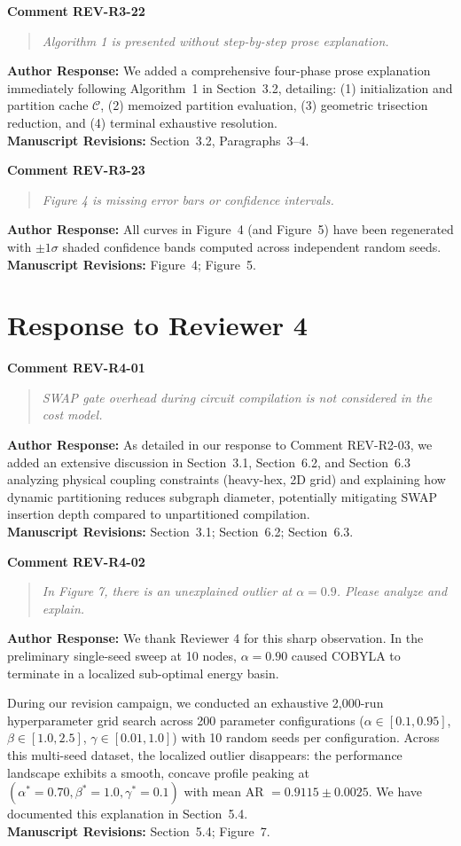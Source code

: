 \documentclass[11pt,a4paper]{article}
\newcommand{\commentbox}[2]{
    \vspace{0.8em}
    \noindent\textbf{\textcolor{commentcolor}{#1}}
    \vspace{0.2em}
    \begin{quote}
        \small\itshape #2
    \end{quote}
}
\newcommand{\responsebox}[1]{
    \noindent\textbf{\textcolor{responsecolor}{Author Response:}} #1
    \vspace{0.8em}
}
\begin{document}
\commentbox{Comment REV-R3-22}{Algorithm 1 is presented without step-by-step prose explanation.}

\responsebox{We added a comprehensive four-phase prose explanation immediately following Algorithm~1 in Section~3.2, detailing: (1) initialization and partition cache $\mathcal{C}$, (2) memoized partition evaluation, (3) geometric trisection reduction, and (4) terminal exhaustive resolution.
\\[0.3em]
\textbf{Manuscript Revisions:} Section~3.2, Paragraphs~3--4.}

\commentbox{Comment REV-R3-23}{Figure 4 is missing error bars or confidence intervals.}

\responsebox{All curves in Figure~4 (and Figure~5) have been regenerated with $\pm 1\sigma$ shaded confidence bands computed across independent random seeds.
\\[0.3em]
\textbf{Manuscript Revisions:} Figure~4; Figure~5.}

\newpage

\section*{Response to Reviewer 4}

\commentbox{Comment REV-R4-01}{SWAP gate overhead during circuit compilation is not considered in the cost model.}

\responsebox{As detailed in our response to Comment REV-R2-03, we added an extensive discussion in Section~3.1, Section~6.2, and Section~6.3 analyzing physical coupling constraints (heavy-hex, 2D grid) and explaining how dynamic partitioning reduces subgraph diameter, potentially mitigating SWAP insertion depth compared to unpartitioned compilation.
\\[0.3em]
\textbf{Manuscript Revisions:} Section~3.1; Section~6.2; Section~6.3.}

\commentbox{Comment REV-R4-02}{In Figure 7, there is an unexplained outlier at $\alpha = 0.9$. Please analyze and explain.}

\responsebox{We thank Reviewer 4 for this sharp observation. In the preliminary single-seed sweep at 10 nodes, $\alpha = 0.90$ caused COBYLA to terminate in a localized sub-optimal energy basin.

During our revision campaign, we conducted an exhaustive 2,000-run hyperparameter grid search across 200 parameter configurations ($\alpha \in [0.1, 0.95]$, $\beta \in [1.0, 2.5]$, $\gamma \in [0.01, 1.0]$) with 10 random seeds per configuration. Across this multi-seed dataset, the localized outlier disappears: the performance landscape exhibits a smooth, concave profile peaking at $(\alpha^* = 0.70, \beta^* = 1.0, \gamma^* = 0.1)$ with mean AR $= 0.9115 \pm 0.0025$. We have documented this explanation in Section~5.4.
\\[0.3em]
\textbf{Manuscript Revisions:} Section~5.4; Figure~7.}
\end{document}
